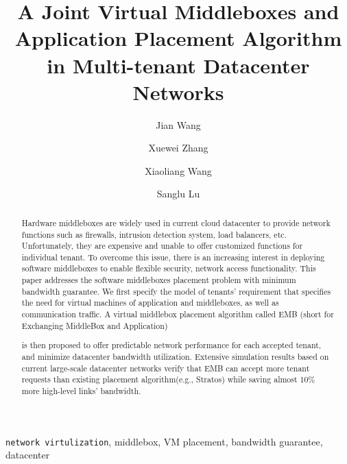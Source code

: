 \documentclass[review]{elsarticle}
\begin{document}
%
\begin{frontmatter}
\title{A Joint Virtual Middleboxes and Application Placement Algorithm in Multi-tenant Datacenter Networks}


\author{Jian Wang}
\author{Xuewei Zhang}
\author{Xiaoliang Wang}
\author{Sanglu Lu\corref{}}
\address{National Key Laboratory for Novel Software Technology, Nanjing University, Nanjing, P.R. China}

\begin{abstract}
Hardware middleboxes are widely used in current cloud datacenter to provide network functions such as firewalls, intrusion detection system, load balancers, etc. Unfortunately, they are expensive and unable to offer customized functions for individual tenant. To overcome this issue, there is an increasing interest in deploying software middleboxes to enable flexible security, network access functionality. This paper addresses the software middleboxes placement problem with minimum bandwidth guarantee. We first specify the model of tenants' requirement that specifies the need for virtual machines of application and middleboxes, as well as communication traffic. A virtual middlebox placement algorithm called EMB (short for Exchanging MiddleBox and Application)  
is then proposed to offer predictable network performance for each accepted tenant, and minimize  datacenter bandwidth utilization. Extensive simulation results based on current large-scale datacenter networks verify that EMB can accept more tenant requests than existing placement algorithm(e.g., Stratos) while saving almost 10\% more high-level links' bandwidth.
\end{abstract}
\begin{keyword}
	\texttt{network virtulization}, middlebox, VM placement, bandwidth guarantee, datacenter
\end{keyword}
\end{frontmatter}
\linenumbers
\end{document}
